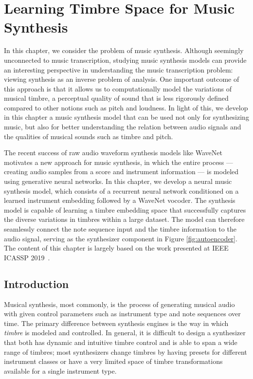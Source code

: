 
\graphicspath{{5-synthesis/figures/}}

\chapter{Learning Timbre Space for Music Synthesis}
\label{ch:synthesis}

In this chapter, we consider the problem of music synthesis.
Although seemingly unconnected to music transcription, studying music synthesis models can provide an interesting perspective in understanding the music transcription problem: viewing synthesis as an inverse problem of analysis.
One important outcome of this approach is that it allows us to computationally model the variations of musical timbre, a perceptual quality of sound that is less rigorously defined compared to other notions such as pitch and loudness.
In light of this, we develop in this chapter a music synthesis model that can be used not only for synthesizing music, but also for better understanding the relation between audio signals and the qualities of musical sounds such as timbre and pitch.

The recent success of raw audio waveform synthesis models like WaveNet motivates a new approach for music synthesis, in which the entire process --- creating audio samples from a score and instrument information --- is modeled using generative neural networks.
In this chapter, we develop a neural music synthesis model, which consists of a recurrent neural network conditioned on a learned instrument embedding followed by a WaveNet vocoder.
The synthesis model is capable of learning a timbre embedding space that successfully captures the diverse variations in timbres within a large dataset.
The model can therefore seamlessly connect the note sequence input and the timbre information to the audio signal, serving as the synthesizer component in Figure \ref{fig:autoencoder}.
The content of this chapter is largely based on the work presented at IEEE ICASSP 2019~\cite{kim2019synthesis}.


\section{Introduction}

Musical synthesis, most commonly, is the process of generating musical audio with given control parameters such as instrument type and note sequences over time.
The primary difference between synthesis engines is the way in which \emph{timbre} is modeled and controlled.
In general, it is difficult to design a synthesizer that both has dynamic and intuitive timbre control and is able to span a wide range of timbres; most synthesizers change timbres by having presets for different instrument classes or have a very limited space of timbre transformations available for a single instrument type.

